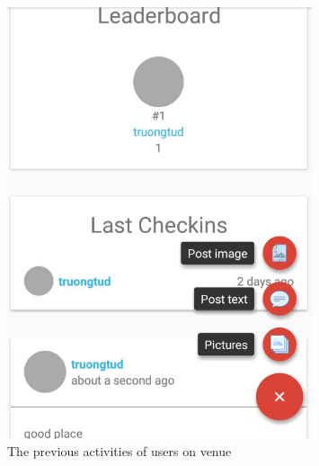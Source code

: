 \begin{figure}[htbp]
	\includegraphics[width=0.8\textwidth]{images/venueInDetail_Part_2.jpg}
	\centering
	\caption{The previous activities of users on venue}\label{fig:previous_activities}
\end{figure}


